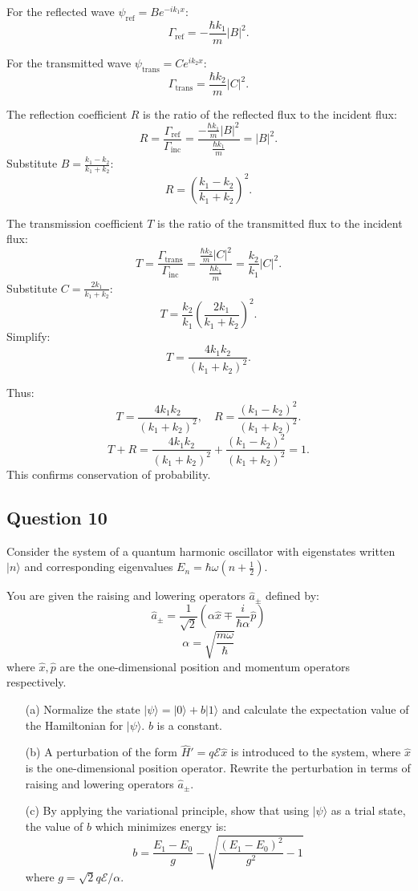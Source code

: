\documentclass{article}
\begin{document}
For the reflected wave $\psi_\text{ref} = Be^{-ik_1x}$:
\[
\Gamma_\text{ref} = -\frac{\hbar k_1}{m} |B|^2.
\]

For the transmitted wave $\psi_\text{trans} = Ce^{ik_2x}$:
\[
\Gamma_\text{trans} = \frac{\hbar k_2}{m} |C|^2.
\]

The reflection coefficient $R$ is the ratio of the reflected flux to the incident flux:
\[
R = \frac{\Gamma_\text{ref}}{\Gamma_\text{inc}} = \frac{-\frac{\hbar k_1}{m} |B|^2}{\frac{\hbar k_1}{m}} = |B|^2.
\]
Substitute $B = \frac{k_1 - k_2}{k_1 + k_2}$:
\[
R = \left( \frac{k_1 - k_2}{k_1 + k_2} \right)^2.
\]

The transmission coefficient $T$ is the ratio of the transmitted flux to the incident flux:
\[
T = \frac{\Gamma_\text{trans}}{\Gamma_\text{inc}} = \frac{\frac{\hbar k_2}{m} |C|^2}{\frac{\hbar k_1}{m}} = \frac{k_2}{k_1} |C|^2.
\]
Substitute $C = \frac{2k_1}{k_1 + k_2}$:
\[
T = \frac{k_2}{k_1} \left( \frac{2k_1}{k_1 + k_2} \right)^2.
\]
Simplify:
\[
T = \frac{4k_1k_2}{(k_1 + k_2)^2}.
\]

Thus:
\[
T = \frac{4k_1k_2}{(k_1 + k_2)^2}, \quad R = \frac{(k_1 - k_2)^2}{(k_1 + k_2)^2}.
\]
\[
T + R = \frac{4k_1k_2}{(k_1 + k_2)^2} + \frac{(k_1 - k_2)^2}{(k_1 + k_2)^2} = 1.
\]
This confirms conservation of probability.


\subsection{Question 10}

Consider the system of a quantum harmonic oscillator with eigenstates written \(|n\rangle\) and corresponding eigenvalues \(E_n = \hbar\omega(n + \frac{1}{2})\). 

You are given the raising and lowering operators \(\hat{a}_\pm\) defined by:
\[
\hat{a}_\pm = \frac{1}{\sqrt{2}} \left(\alpha \hat{x} \mp \frac{i}{\hbar \alpha} \hat{p}\right)
\]
\[
\alpha = \sqrt{\frac{m\omega}{\hbar}}
\]
where \(\hat{x}, \hat{p}\) are the one-dimensional position and momentum operators respectively.

\begin{enumerate}
    \item[(a)] Normalize the state \(|\psi\rangle = |0\rangle + b |1\rangle\) and calculate the expectation value of the Hamiltonian for \(|\psi\rangle\). \(b\) is a constant.
    
    \item[(b)] A perturbation of the form \(\hat{H}' = q \mathcal{E} \hat{x}\) is introduced to the system, where \(\hat{x}\) is the one-dimensional position operator. Rewrite the perturbation in terms of raising and lowering operators \(\hat{a}_\pm\).
    
    \item[(c)] By applying the variational principle, show that using \(|\psi\rangle\) as a trial state, the value of \(b\) which minimizes energy is:
    \[
    b = \frac{E_1 - E_0}{g} - \sqrt{\frac{(E_1 - E_0)^2}{g^2} - 1}
    \]
    where \(g = \sqrt{2}q\mathcal{E}/\alpha\).
\end{enumerate}
\end{document}
